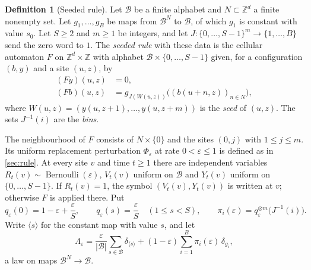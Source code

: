 \documentclass[11pt]{article}
\theoremstyle{plain}
\theoremstyle{definition}
\newtheorem{definition}[theorem]{Definition}
\theoremstyle{remark}
\newcommand{\Z}{\mathbb Z}
\newcommand{\eps}{\varepsilon}
\begin{document}
\begin{definition}[Seeded rule]\label{def:seeded}
Let $\mathcal B$ be a finite alphabet and $N\subset\Z^d$ a finite nonempty set. Let $g_1,\ldots,g_B$ be maps from $\mathcal B^N$ to $\mathcal B$, of which $g_1$ is constant with value $s_0$. Let $S\geq2$ and $m\geq1$ be integers, and let $J\colon\{0,\ldots,S-1\}^m\to\{1,\ldots,B\}$ send the zero word to $1$. The \emph{seeded rule} with these data is the cellular automaton $F$ on $\Z^d\times\Z$ with alphabet $\mathcal B\times\{0,\ldots,S-1\}$ given, for a configuration $(b,y)$ and a site $(u,z)$, by
\begin{align}
 (Fy)(u,z)&=0,\label{eq:seed-y}\\
 (Fb)(u,z)&=g_{J(W(u,z))}\bigl((b(u+n,z))_{n\in N}\bigr),\label{eq:seed-b}
\end{align}
where $W(u,z)=(y(u,z+1),\ldots,y(u,z+m))$ is the \emph{seed} of $(u,z)$. The sets $J^{-1}(i)$ are the \emph{bins}.
\end{definition}

The neighbourhood of $F$ consists of $N\times\{0\}$ and the sites $(0,j)$ with $1\leq j\leq m$. Its uniform replacement perturbation $\Phi_\eps$ at rate $0<\eps\leq1$ is defined as in \cref{sec:rule}. At every site $v$ and time $t\geq1$ there are independent variables $R_t(v)\sim\operatorname{Bernoulli}(\eps)$, $V_t(v)$ uniform on $\mathcal B$ and $Y_t(v)$ uniform on $\{0,\ldots,S-1\}$. If $R_t(v)=1$, the symbol $(V_t(v),Y_t(v))$ is written at $v$; otherwise $F$ is applied there. Put
\begin{equation}\label{eq:seed-q}
 q_\eps(0)=1-\eps+\frac{\eps}{S},\qquad q_\eps(s)=\frac{\eps}{S}\quad(1\leq s<S),\qquad
 \pi_i(\eps)=q_\eps^{\otimes m}\bigl(J^{-1}(i)\bigr).
\end{equation}
Write $\langle s\rangle$ for the constant map with value $s$, and let
\[
 \Lambda_\eps=\frac{\eps}{|\mathcal B|}\sum_{s\in\mathcal B}\delta_{\langle s\rangle}
 +(1-\eps)\sum_{i=1}^B\pi_i(\eps)\,\delta_{g_i},
\]
a law on maps $\mathcal B^N\to\mathcal B$.
\end{document}
